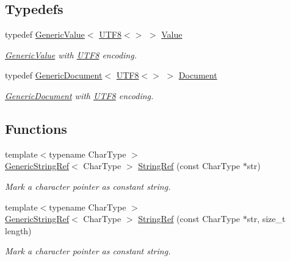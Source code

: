 \subsection*{Typedefs}
\begin{DoxyCompactItemize}
\item 
\mbox{\label{a00476_a071cf97155ba72ac9a1fc4ad7e63d481}} 
typedef \hyperlink{a01992}{Generic\+Value}$<$ \hyperlink{a02144}{U\+T\+F8}$<$$>$ $>$ \hyperlink{a00476_a071cf97155ba72ac9a1fc4ad7e63d481}{Value}
\begin{DoxyCompactList}\small\item\em \hyperlink{a01992}{Generic\+Value} with \hyperlink{a02144}{U\+T\+F8} encoding. \end{DoxyCompactList}\item 
\mbox{\label{a00476_ac6ea5b168e3fe8c7fa532450fc9391f7}} 
typedef \hyperlink{a01996}{Generic\+Document}$<$ \hyperlink{a02144}{U\+T\+F8}$<$$>$ $>$ \hyperlink{a00476_ac6ea5b168e3fe8c7fa532450fc9391f7}{Document}
\begin{DoxyCompactList}\small\item\em \hyperlink{a01996}{Generic\+Document} with \hyperlink{a02144}{U\+T\+F8} encoding. \end{DoxyCompactList}\end{DoxyCompactItemize}
\subsection*{Functions}
\begin{DoxyCompactItemize}
\item 
{\footnotesize template$<$typename Char\+Type $>$ }\\\hyperlink{a02008}{Generic\+String\+Ref}$<$ Char\+Type $>$ \hyperlink{a00476_aa6b9fd9f6aa49405a574c362ba9af6b5}{String\+Ref} (const Char\+Type $\ast$str)
\begin{DoxyCompactList}\small\item\em Mark a character pointer as constant string. \end{DoxyCompactList}\item 
{\footnotesize template$<$typename Char\+Type $>$ }\\\hyperlink{a02008}{Generic\+String\+Ref}$<$ Char\+Type $>$ \hyperlink{a00476_a578c51ab574a50a9c760b9da7c7562f2}{String\+Ref} (const Char\+Type $\ast$str, size\+\_\+t length)
\begin{DoxyCompactList}\small\item\em Mark a character pointer as constant string. \end{DoxyCompactList}\end{DoxyCompactItemize}


